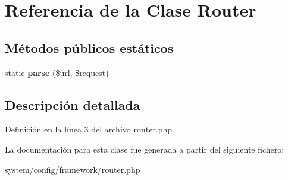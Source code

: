 \hypertarget{class_router}{}\section{Referencia de la Clase Router}
\label{class_router}
\subsection*{Métodos públicos estáticos}
\begin{DoxyCompactItemize}
\item 
\mbox{\label{class_router_aea0d80d7b62953a4b30bacd6a3a8235d}} 
static {\bfseries parse} (\$url, \$request)
\end{DoxyCompactItemize}


\subsection{Descripción detallada}


Definición en la línea 3 del archivo router.\+php.



La documentación para esta clase fue generada a partir del siguiente fichero\+:\begin{DoxyCompactItemize}
\item 
system/config/framework/router.\+php\end{DoxyCompactItemize}
